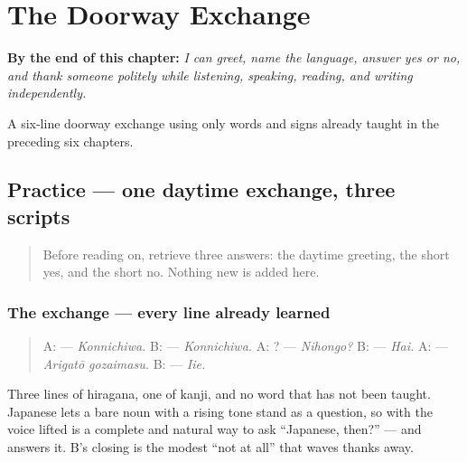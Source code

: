 
\chapter{The Doorway Exchange}
\label{ch:ja-doorway-exchange}

\begin{chapteropening}
\textbf{By the end of this chapter:} \emph{I can greet, name the language, answer yes or no, and thank someone politely while listening, speaking, reading, and writing independently.}

A six-line doorway exchange using only words and signs already taught in the preceding six chapters.
\end{chapteropening}

\section[Practice]{Practice — one daytime exchange, three scripts}

\label{lesson:JA-C01-practice}



\begin{quote}
Before reading on, retrieve three answers: the daytime greeting, the short yes, and the short no. Nothing new is added here.
\end{quote}

\subsection*{The exchange — every line already learned}
\begin{quote}
A: \textbf{} — \emph{Konnichiwa.} B: \textbf{} — \emph{Konnichiwa.} A: \textbf{}? — \emph{Nihongo?} B: \textbf{} — \emph{Hai.} A: \textbf{} — \emph{Arigatō gozaimasu.} B: \textbf{} — \emph{Iie.}
\end{quote}

Three lines of hiragana, one of kanji, and no word that has not been taught. Japanese lets a bare noun with a rising tone stand as a question, so \textbf{} with the voice lifted is a complete and natural way to ask \textquotedblleft{}Japanese, then?\textquotedblright{} — and \textbf{} answers it. B's closing \textbf{} is the modest \textquotedblleft{}not at all\textquotedblright{} that waves thanks away.

